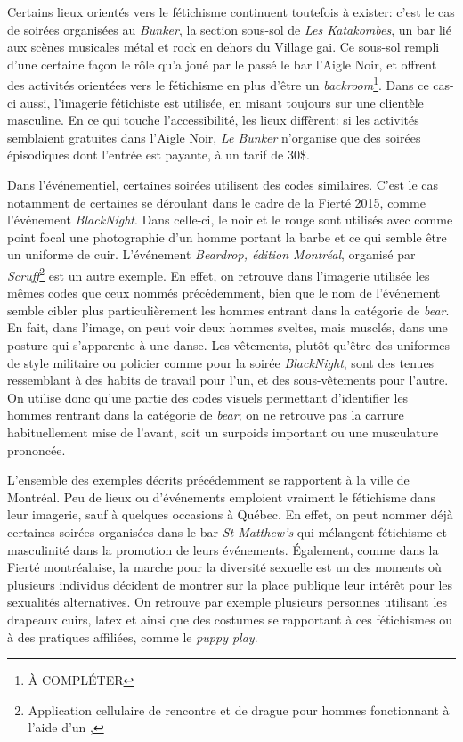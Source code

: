 Certains lieux orientés vers le fétichisme continuent toutefois à exister: c'est le cas de soirées organisées au \emph{Bunker}, la section sous-sol de \emph{Les Katakombes}, un bar lié aux scènes musicales métal et rock en dehors du Village gai.
Ce sous-sol rempli d'une certaine façon le rôle qu'a joué par le passé le bar l'Aigle Noir, et offrent des activités orientées vers le fétichisme en plus d'être un \emph{backroom}\footnote{À COMPLÉTER}.
Dans ce cas-ci aussi, l'imagerie fétichiste est utilisée, en misant toujours sur une clientèle masculine.
En ce qui touche l'accessibilité, les lieux diffèrent: si les activités semblaient gratuites dans l'Aigle Noir, \emph{Le Bunker} n'organise que des soirées épisodiques dont l'entrée est payante, à un tarif de 30\$.

Dans l'événementiel, certaines soirées utilisent des codes similaires.
C'est le cas notamment de certaines se déroulant dans le cadre de la Fierté 2015, comme l'événement  \emph{BlackNight}.
Dans celle-ci, le noir et le rouge sont utilisés avec comme point focal une photographie d'un homme portant la barbe et ce qui semble être un uniforme de cuir.
L'événement \emph{Beardrop, édition Montréal}, organisé par \emph{Scruff}\footnote{Application cellulaire de rencontre et de drague pour hommes fonctionnant à l'aide d'un \gps{},} est un autre exemple.
En effet, on retrouve dans l'imagerie utilisée les mêmes codes que ceux nommés précédemment, bien que le nom de l'événement semble cibler plus particulièrement les hommes entrant dans la catégorie de \emph{bear}.
En fait, dans l'image, on peut voir deux hommes sveltes, mais musclés, dans une posture qui s'apparente à une danse.
Les vêtements, plutôt qu'être des uniformes de style militaire ou policier comme pour la soirée \emph{BlackNight}, sont des tenues ressemblant à des habits de travail pour l'un, et des sous-vêtements pour l'autre.
On utilise donc qu'une partie des codes visuels permettant d'identifier les hommes rentrant dans la catégorie de \emph{bear}; on ne retrouve pas la carrure habituellement mise de l'avant, soit un surpoids important ou une musculature prononcée.

L'ensemble des exemples décrits précédemment se rapportent à la ville de Montréal.
Peu de lieux ou d'événements emploient vraiment le fétichisme dans leur imagerie, sauf à quelques occasions à Québec.
En effet, on peut nommer déjà certaines soirées organisées dans le bar \emph{St-Matthew's} qui mélangent fétichisme et masculinité dans la promotion de leurs événements.
Également, comme dans la Fierté montréalaise, la marche pour la diversité sexuelle est un des moments où plusieurs individus décident de montrer sur la place publique leur intérêt pour les sexualités alternatives.
On retrouve par exemple plusieurs personnes utilisant les drapeaux cuirs, latex et \bdsm{} ainsi que des costumes se rapportant à ces fétichismes ou à des pratiques affiliées, comme le \emph{puppy play}.

